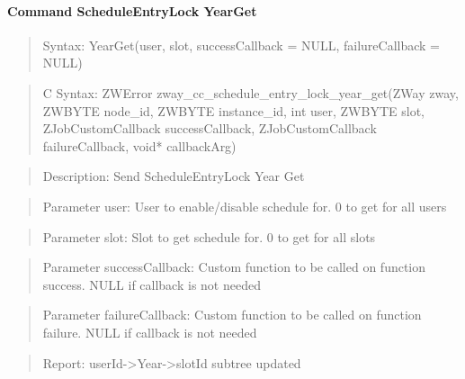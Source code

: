 \paragraph{Command ScheduleEntryLock YearGet}
\begin{quote}Syntax: YearGet(user, slot, successCallback = NULL, failureCallback = NULL)\end{quote}
\begin{quote}C Syntax: ZWError zway\_cc\_schedule\_entry\_lock\_year\_get(ZWay zway, ZWBYTE node\_id, ZWBYTE instance\_id, int user, ZWBYTE slot, ZJobCustomCallback successCallback, ZJobCustomCallback failureCallback, void* callbackArg)\end{quote}
\begin{quote}Description: Send ScheduleEntryLock Year Get\end{quote}
\begin{quote}Parameter user: User to enable/disable schedule for. 0 to get for all users\end{quote}
\begin{quote}Parameter slot: Slot to get schedule for. 0 to get for all slots\end{quote}
\begin{quote}Parameter successCallback: Custom function to be called on function success. NULL if callback is not needed\end{quote}
\begin{quote}Parameter failureCallback: Custom function to be called on function failure. NULL if callback is not needed\end{quote}
\begin{quote}Report: userId->Year->slotId subtree updated\end{quote}

